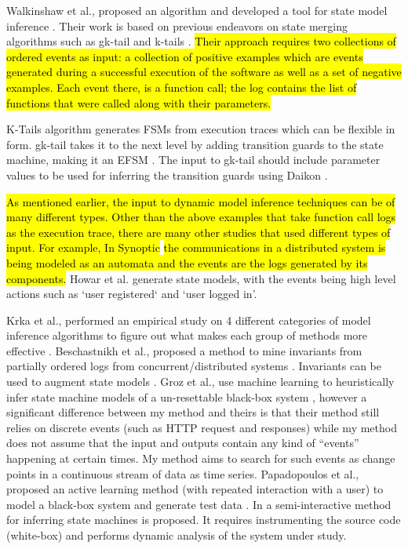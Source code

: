 Walkinshaw et al., proposed an algorithm and developed a tool for state model inference \cite{walkinshaw2016inferring}. Their work is based on previous endeavors on state merging algorithms such as gk-tail and k-tails \cite{lorenzoli2008automatic, biermann1972synthesis}. \hl{Their approach requires two collections of ordered events as input: a collection of positive examples which are events generated during a successful execution of the software as well as a set of negative examples. Each event there, is a function call; the log contains the list of functions that were called along with their parameters.}

K-Tails algorithm \cite{biermann1972synthesis} generates FSMs from execution traces which can be flexible in form. gk-tail takes it to the next level by adding transition guards to the state machine, making it an EFSM \cite{lorenzoli2008automatic}. 
The input to gk-tail should include parameter values to be used for inferring the transition guards using Daikon \cite{ernst2007daikon}. 

\hl{As mentioned earlier, the input to dynamic model inference techniques can be of many different types. Other than the above examples that take function call logs as the execution trace, there are many other studies that used different types of input. For example, In Synoptic} \cite{schneider2010synoptic} \hl{the communications in a distributed system is being modeled as an automata and the events are the logs generated by its components.}
Howar et al. \cite{howar2012inferring}  generate state models, with the events being high level actions such as `user registered` and `user logged in'.

Krka et al., performed an empirical study on 4 different categories of model inference algorithms to figure out what makes each group of methods more effective \cite{krka2014automatic}. Beschastnikh et al., proposed a method to mine invariants from partially ordered logs from concurrent/distributed systems \cite{beschastnikh2011mining}. Invariants can be used to augment state models \cite{beschastnikh2014inferring, beschastnikh2011leveraging}. Groz et al., use machine learning to heuristically infer state machine models of a un-resettable black-box system \cite{groz2018revisiting}, however a significant difference between my method and theirs is that their method still relies on discrete events (such as HTTP request and responses) while my method does not assume that the input and outputs contain any kind of ``events'' happening at certain times. My method aims to search for such events as change points in a continuous stream of data as time series. 
Papadopoulos et al., proposed an active learning method (with repeated interaction with a user) to model a black-box system and generate test data \cite{Papadopoulos2015}. 
In \cite{jafar2019interactive} a semi-interactive method for inferring state machines is proposed. It requires instrumenting the source code (white-box) and performs dynamic analysis of the system under study.

